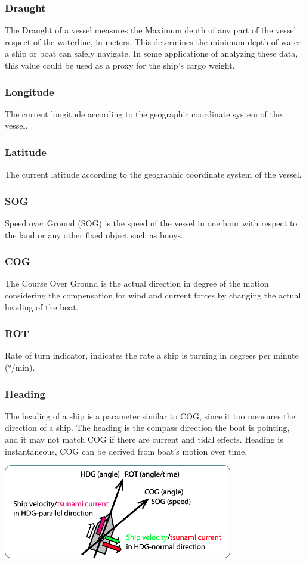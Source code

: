 \subsubsection{Draught}
    The Draught of a vessel measures the Maximum depth of any part of the vessel respect of the waterline, in meters. This determines the minimum depth of water a ship or boat can safely navigate. In some applications of analyzing these data, this value could be used as a proxy for the ship's cargo weight.
\subsubsection{Longitude}
    The current longitude according to the geographic coordinate system of the vessel.
\subsubsection{Latitude}
    The current latitude according to the geographic coordinate system of the vessel.
\subsubsection{SOG}
    Speed over Ground (SOG) is the speed of the vessel in one hour with respect to the land or any other fixed object such as buoys.
\subsubsection{COG}
    The Course Over Ground is the actual direction in degree of the motion considering the compensation for wind and current forces by changing the actual heading of the boat.
\subsubsection{ROT}
    Rate of turn indicator, indicates the rate a ship is turning in degrees per minute (°/min).
\subsubsection{Heading}
    The heading of a ship is a parameter similar to COG, since it too measures the direction of a ship. The heading is the compass direction the boat is pointing, and it may not match COG if there are current and tidal effects. Heading is instantaneous, COG can be derived from boat's motion over time.
    \\
    \begin{center}
    \includegraphics[width=10cm]{Images/appendices/cog-sog.png}
    \end{center}
